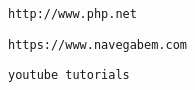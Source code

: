 
\begin{thebibliography}{99}

	\normalsize
	
	
	
	\bibitem{} {}
	\texttt{http://www.php.net}

     \bibitem{}	{}
	 \texttt{https://www.navegabem.com}
	 
	 
	 \bibitem{}{}
	 \texttt{youtube tutorials}
	 
	 
\end{thebibliography}
        
